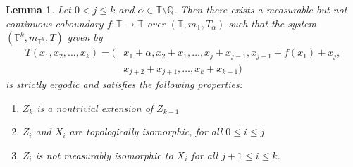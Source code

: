 \documentclass[12pt]{amsart}
\theoremstyle{definition}
\theoremstyle{plain}
\newtheorem{lemma}[theorem]{Lemma}
\theoremstyle{definition}
\numberwithin{equation}{section}
\begin{document}
\begin{lemma}\label{lemma with three properties}
    Let $0< j \leq  k$ and $\alpha \in \mathbb{T}\setminus\mathbb{Q}$. Then there exists a measurable but not continuous coboundary $f\colon \mathbb{T} \rightarrow \mathbb{T}$ over $(\mathbb{T},m_{\mathbb{T}},T_{\alpha})$ such that the system $(\mathbb{T}^{k},m_{\mathbb{T}^{k}},T)$ given by 
  \begin{align*}
    T(x_1,x_2,\dots,x_{k})=\Big(&x_1+\alpha,x_2+x_1,\dots,x_{j}+x_{j-1},x_{j+1}+f(x_1)+x_{j},\\
    &x_{j+2}+x_{j+1},\dots,x_{k}+x_{k-1}\Big)
  \end{align*}
 is strictly ergodic and satisfies the following properties:

  \begin{enumerate}
   \item $Z_k$ is a nontrivial extension of $Z_{k-1}$
      \item $Z_{i}$ and $X_{i}$ are topologically isomorphic, for all $0 \leq i \leq j$
      \item $Z_i$ is not measurably isomorphic to $X_i$ for all $j+1 \leq i \leq k$.
\end{enumerate}
\end{lemma}
\end{document}
